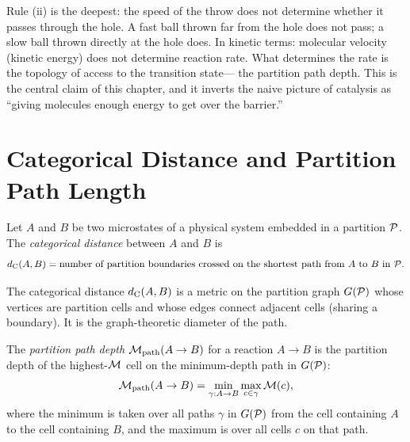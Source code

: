 \begin{remark}
Rule (ii) is the deepest: the speed of the throw does not determine whether
it passes through the hole. A fast ball thrown far from the hole does not
pass; a slow ball thrown directly at the hole does. In kinetic terms:
molecular velocity (kinetic energy) does not determine reaction rate.
What determines the rate is the topology of access to the transition state---
the partition path depth. This is the central claim of this chapter,
and it inverts the naive picture of catalysis as ``giving molecules enough
energy to get over the barrier.''
\end{remark}

\section{Categorical Distance and Partition Path Length}
\label{sec:categorical_distance}

\begin{definition}
\label{def:categorical_distance}
Let $A$ and $B$ be two microstates of a physical system embedded in a
partition $\mathcal{P}$. The \emph{categorical distance} between $A$ and $B$ is
\begin{equation}
  d_{\mathrm{C}}(A, B) = \text{number of partition boundaries crossed on the shortest
               path from } A \text{ to } B \text{ in } \mathcal{P}.
  \label{eq:categorical_distance}
\end{equation}
\end{definition}

The categorical distance $d_{\mathrm{C}}(A, B)$ is a metric on the partition graph
$G(\mathcal{P})$ whose vertices are partition cells and whose edges connect adjacent
cells (sharing a boundary). It is the graph-theoretic diameter of the path.

\begin{definition}
\label{def:path_depth}
The \emph{partition path depth} $\mathcal{M}_{\mathrm{path}}(A \to B)$ for a
reaction $A \to B$ is the partition depth of the highest-$\mathcal{M}$ cell on
the minimum-depth path in $G(\mathcal{P})$:
\begin{equation}
  \mathcal{M}_{\mathrm{path}}(A \to B) = \min_{\gamma: A \to B}
    \max_{c \in \gamma} \mathcal{M}(c),
  \label{eq:path_depth}
\end{equation}
where the minimum is taken over all paths $\gamma$ in $G(\mathcal{P})$ from the
cell containing $A$ to the cell containing $B$, and the maximum is over all
cells $c$ on that path.
\end{definition}

